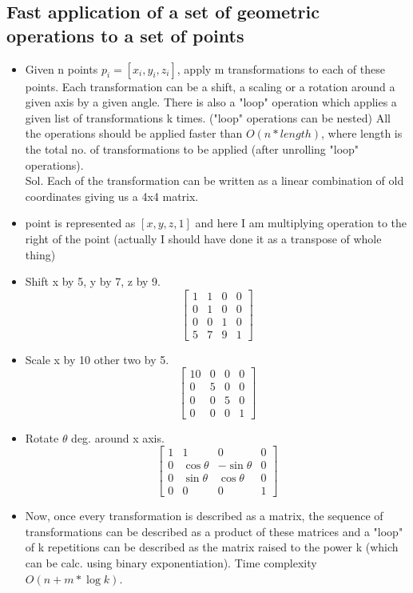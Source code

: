 \documentclass[8pt, a4paper, oneside, twocolumn]{extarticle}
\begin{document}
\subsection{Fast application of a set of geometric operations to a set of points}
\begin{itemize}
    \item Given n points $p_i = [x_i, y_i, z_i]$, apply m transformations to each of these points. Each transformation can be a shift, a scaling or a rotation around a given axis by a given angle. There is also a "loop" operation which applies a given list of transformations k times. ("loop" operations can be nested) All the operations should be applied faster than $O(n * length)$, where length is the total no. of transformations to be applied (after unrolling "loop" operations).
    \\ Sol. Each of the transformation can be written as a linear combination of old coordinates giving us a 4x4 matrix.
    \item point is represented as $[x, y, z, 1]$ and here I am multiplying operation to the right of the point (actually I should have done it as a transpose of whole thing)
    \item Shift x by 5, y by 7, z by 9.
    \[\begin{bmatrix}
    1 & 1 & 0 & 0\\
    0 & 1 & 0 & 0\\
    0 & 0 & 1 & 0\\
    5 & 7 & 9 & 1
    \end{bmatrix}\]
    \item Scale x by 10 other two by 5.
    \[\begin{bmatrix}
    10 & 0 & 0 & 0\\
    0 & 5 & 0 & 0\\
    0 & 0 & 5 & 0\\
    0 & 0 & 0 & 1
    \end{bmatrix}\]
    \item Rotate $\theta$ deg. around x axis.
    \[\begin{bmatrix}
    1 & 1 & 0 & 0\\
    0 & \cos{\theta} & -\sin{\theta} & 0\\
    0 & \sin{\theta} & \cos{\theta} & 0\\
    0 & 0 & 0 & 1
    \end{bmatrix}\]
    \item Now, once every transformation is described as a matrix, the sequence of transformations can be described as a product of these matrices and a "loop" of k repetitions can be described as the matrix raised to the power k (which can be calc. using binary exponentiation). Time complexity $O(n + m * \log{k})$.
\end{itemize}
\end{document}

